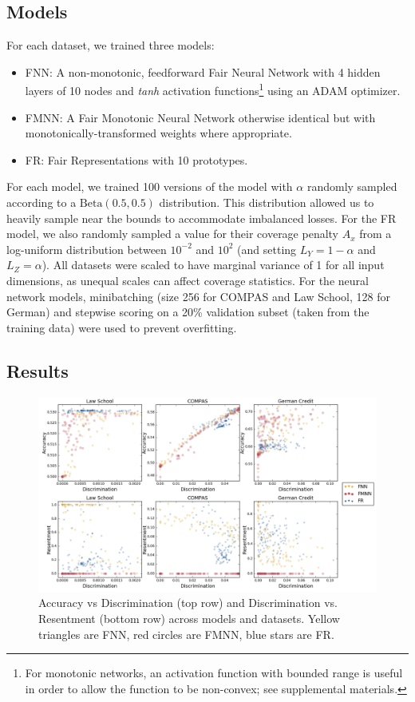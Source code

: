     \subsection{Models}
        For each dataset, we trained three models:
        \begin{itemize}
            \item FNN: A non-monotonic, feedforward Fair Neural Network with 4 hidden layers of 10 nodes and \textit{tanh} activation functions\footnote{For monotonic networks, an activation function with bounded range is useful in order to allow the function to be non-convex; see supplemental materials.} using an ADAM optimizer.
            \item FMNN: A Fair Monotonic Neural Network otherwise identical but with monotonically-transformed weights where appropriate.
            \item FR: Fair Representations \cite{ZemQiSwePitDwo2013} with 10 prototypes. 
        \end{itemize}
        
        For each model, we trained 100 versions of the model with $\alpha$ randomly sampled according to a  $\mbox{Beta}(0.5, 0.5)$ distribution.  This distribution allowed us to heavily sample near the bounds to accommodate imbalanced losses.  For the FR model, we also randomly sampled a value for their coverage penalty $A_x$ from a log-uniform distribution between $10^{-2}$ and $10^2$ (and setting $L_Y = 1 - \alpha$ and $L_Z = \alpha$).  All datasets were scaled to have marginal variance of 1 for all input dimensions, as unequal scales can affect coverage statistics.  For the neural network models, minibatching (size 256 for COMPAS and Law School, 128 for German) and stepwise scoring on a 20\% validation subset (taken from the training data) were used to prevent overfitting.
   
    \subsection{Results}
        \begin{figure}[h!]
            \centering
            \includegraphics[width=\textwidth]{fig_monofair/accuracy_and_resent_vs_discrimination.png}
            \caption{Accuracy vs Discrimination (top row) and Discrimination vs. Resentment (bottom row) across models and datasets.  Yellow triangles are FNN, red circles are FMNN, blue stars are FR.}
        \label{fig:tradeoffs}
        \end{figure}
        
